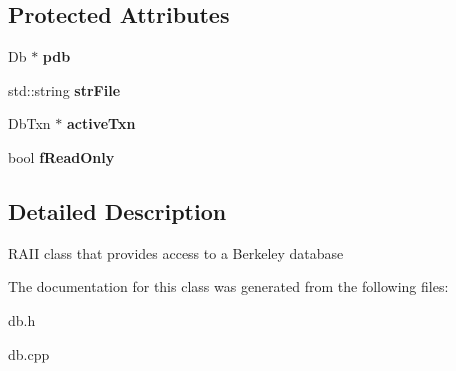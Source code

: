 \subsection*{Protected Attributes}
\begin{DoxyCompactItemize}
\item 
\mbox{\label{class_c_d_b_a4520f55d31246fc06d80f72b5dd62253}} 
Db $\ast$ {\bfseries pdb}
\item 
\mbox{\label{class_c_d_b_a15c6112d9db9dcc5f11a2c05d9aa74a5}} 
std\+::string {\bfseries str\+File}
\item 
\mbox{\label{class_c_d_b_ac06d74a2d113f593869d2f93188a0adc}} 
Db\+Txn $\ast$ {\bfseries active\+Txn}
\item 
\mbox{\label{class_c_d_b_a92ca6c13982a03afdb846588a61608fc}} 
bool {\bfseries f\+Read\+Only}
\end{DoxyCompactItemize}


\subsection{Detailed Description}
R\+A\+II class that provides access to a Berkeley database 

The documentation for this class was generated from the following files\+:\begin{DoxyCompactItemize}
\item 
db.\+h\item 
db.\+cpp\end{DoxyCompactItemize}
